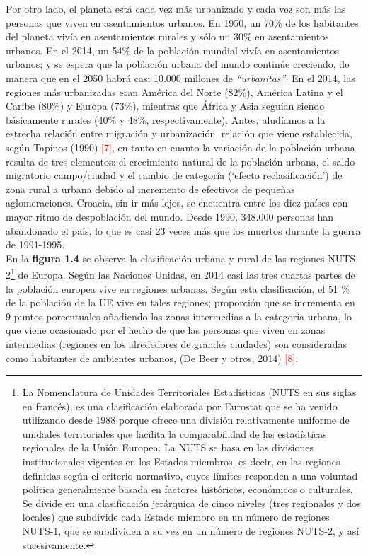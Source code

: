 \vspace{-0.2cm}
Por otro lado, el planeta est\'a cada vez m\'as urbanizado y cada vez son m\'as las personas que viven en asentamientos urbanos. En 1950, un 70\% de los habitantes del planeta viv\'ia en asentamientos rurales y s\'olo un 30\% en asentamientos urbanos. En el 2014, un 54\% de la poblaci\'on mundial viv\'ia en asentamientos urbanos; y se espera que la poblaci\'on urbana del mundo contin\'ue creciendo, de manera que en el 2050 habr\'a casi 10.000 millones de \textit{``urbanitas''}. En el 2014, las regiones m\'as urbanizadas eran Am\'erica del Norte (82\%), Am\'erica Latina y el Caribe (80\%) y Europa (73\%), mientras que \'Africa y Asia segu\'ian siendo b\'asicamente rurales (40\% y 48\%, respectivamente). Antes, alud\'iamos a la estrecha relaci\'on entre migraci\'on y urbanizaci\'on, relaci\'on que viene establecida, seg\'un Tapinos (1990) \textcolor{red}{[7]}, en tanto en cuanto la variaci\'on de la poblaci\'on urbana resulta de tres elementos: el crecimiento natural de la poblaci\'on urbana, el saldo migratorio campo/ciudad y el cambio de categor\'ia (`efecto reclasificaci\'on') de zona rural a urbana debido al incremento de efectivos de peque\~nas aglomeraciones. Croacia, sin ir m\'as lejos, se encuentra entre los diez pa\'ises con mayor ritmo de despoblaci\'on del mundo. Desde 1990, 348.000 personas han abandonado el pa\'is, lo que es casi 23 veces m\'as que los muertos durante la guerra de 1991-1995.\\

\vspace{-0.3cm}
En la \textbf{figura 1.4} se observa la clasificaci\'on urbana y rural de las regiones NUTS-2\footnote{La Nomenclatura de Unidades Territoriales Estad\'isticas (NUTS en sus siglas en franc\'es), es una clasificaci\'on elaborada por Eurostat que se ha venido utilizando desde 1988 porque ofrece una divisi\'on relativamente uniforme de unidades territoriales que facilita la comparabilidad de las estad\'isticas regionales de la Uni\'on Europea. La NUTS se basa en las divisiones institucionales vigentes en los Estados miembros, es decir, en las regiones definidas seg\'un el criterio normativo, cuyos l\'imites responden a una voluntad pol\'itica generalmente basada en factores hist\'oricos, econ\'omicos o culturales. Se divide en una clasificaci\'on jer\'arquica de cinco niveles (tres regionales y dos locales) que subdivide cada Estado miembro en un n\'umero de regiones NUTS-1, que se subdividen a su vez en un n\'umero de regiones NUTS-2, y as\'i sucesivamente.} de Europa. Seg\'un las Naciones Unidas, en 2014 casi las tres cuartas partes de la poblaci\'on europea vive en regiones urbanas. Seg\'un esta clasificaci\'on, el 51 \% de la poblaci\'on de la UE vive en tales regiones; proporci\'on que se incrementa en 9 puntos porcentuales a\~nadiendo las zonas intermedias a la categor\'ia urbana, lo que viene ocasionado por el hecho de que las personas que viven en zonas intermedias (regiones en los alrededores de grandes ciudades) son consideradas como habitantes de ambientes urbanos, (De Beer y otros, 2014) \textcolor{red}{[8]}.

